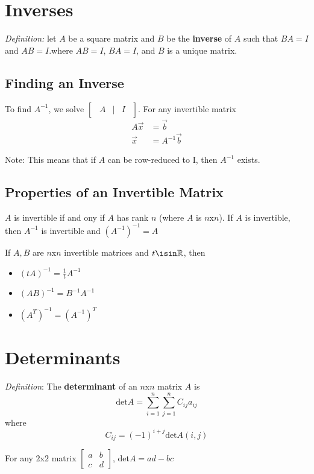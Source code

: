 \documentclass[12pt]{article}
\begin{document}
\section*{Inverses}
\textit{Definition:} let $A$ be a square matrix and $B$ be the {\bf inverse} of $A$ such that $BA = I$ and $AB = I$.where $AB = I$, $BA = I$, and $B$ is a unique matrix.

\subsection*{Finding an Inverse}
To find $A^{-1}$, we solve $\begin{bmatrix}\ \ A&\bigg|&I\ \ \end{bmatrix}$. For any invertible matrix
\begin{align*}
A\vec{x} &= \vec{b}\\
\vec{x} &= A^{-1}\vec{b}
\end{align*}

Note: This means that if $A$ can be row-reduced to I, then $A^{-1}$ exists.

\subsection*{Properties of an Invertible Matrix}
$A$ is invertible if and ony if $A$ has rank $n$ (where $A$ is $n$x$n$). If $A$ is invertible, then $A^{-1}$ is invertible and $(A^{-1})^{-1} = A$

If $A, B$ are $n$x$n$ invertible matrices and $t\isin\mathbb{R}$, then
\begin{itemize}
\item $(tA)^{-1} = \frac{1}{t}A^{-1}$
\item $(AB)^{-1} = B^{-1}A^{-1}$
\item $(A^T)^{-1} = (A^{-1})^T$
\end{itemize}

\section*{Determinants}
\textit{Definition}: The {\bf determinant} of an $n$x$n$ matrix $A$ is \[ \text{det}A = \sum_{i=1}^n \sum_{j=1}^n C_{ij}a_{ij} \] where \[ C_{ij} = (-1)^{i+j}\text{det}A(i,j) \]

For any $2$x$2$ matrix $\begin{bmatrix}a&b\\c&d\end{bmatrix}$, det$A = ad-bc$
\end{document}
